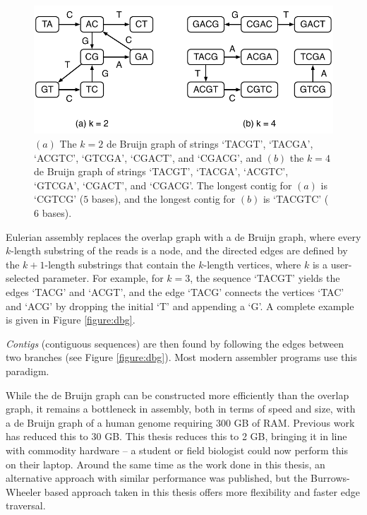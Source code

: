 \documentclass[a4paper,11pt]{article}
\begin{document}
\begin{figure}[!h]
	\begin{center}
		\includegraphics[scale=0.8]{images/altering-k.pdf}
		\caption{$(a)$ The $k=2$ de Bruijn graph of strings `TACGT', `TACGA', `ACGTC', `GTCGA', `CGACT', and
			`CGACG', and $(b)$ the $k=4$ de Bruijn graph of strings `TACGT', `TACGA', `ACGTC', `GTCGA', `CGACT', and
			`CGACG'. The longest contig for $(a)$ is `CGTCG' ($5$ bases), and the longest contig for $(b)$ is `TACGTC' ($6$ bases).}
		\label{figure:varying-k}
	\end{center}
\end{figure}


Eulerian assembly replaces the overlap graph with a de Bruijn graph, where every $k$-length substring of the reads is a node, and the directed edges are defined by the $k+1$-length substrings that contain the $k$-length vertices, where $k$ is a user-selected parameter. For example, for $k=3$, the sequence `TACGT' yields the edges `TACG' and `ACGT', and the edge `TACG' connects the vertices `TAC' and `ACG' by dropping the initial `T' and appending a `G'. A complete example is given in Figure \ref{figure:dbg}.

\emph{Contigs} (contiguous sequences) are then found by following the edges between two branches (see Figure \ref{figure:dbg}). Most modern assembler programs use this paradigm.

While the de Bruijn graph can be constructed more efficiently than the overlap graph, it remains a bottleneck in assembly, both in terms of speed and size, with a de Bruijn graph of a human genome requiring 300 GB of RAM. Previous work has reduced this to 30 GB. This thesis reduces this to 2 GB, bringing it in line with commodity hardware -- a student or field biologist could now perform this on their laptop. Around the same time as the work done in this thesis, an alternative approach with similar performance was published, but the Burrows-Wheeler based approach taken in this thesis offers more flexibility and faster edge traversal.
\end{document}
